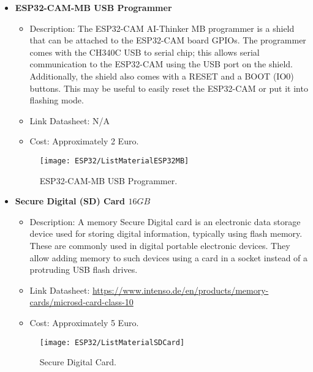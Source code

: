 \begin{itemize}
    \item \textbf{ESP32-CAM-MB USB Programmer} 
    
    \begin{itemize}
        \item Description: The ESP32-CAM AI-Thinker MB programmer is a shield that can be attached to the ESP32-CAM board GPIOs. The programmer comes with the CH340C USB to serial chip; this allows serial communication to the ESP32-CAM using the USB port on the shield. Additionally, the shield also comes with a RESET and a BOOT (IO0) buttons. This may be useful to easily reset the ESP32-CAM or put it into flashing mode.
        \item Link Datasheet: N/A
        \item Cost: Approximately 2 Euro.
    \end{itemize}
    
    \begin{figure}  
        \begin{center}
            \texttt{[image: ESP32/ListMaterialESP32MB]}
            \caption{ESP32-CAM-MB USB Programmer.} 
            \label{fig:ESP32-CAM-MB USB Programmer.}
        \end{center}
    \end{figure}	
    
    \item \textbf{Secure Digital (SD) Card \(16 GB\)} 
    
    \begin{itemize}
        \item Description: A memory Secure Digital card is an electronic data storage device used for storing digital information, typically using flash memory. These are commonly used in digital portable electronic devices. They allow adding memory to such devices using a card in a socket instead of a protruding USB flash drives.
        \item Link Datasheet: \url{https://www.intenso.de/en/products/memory-cards/microsd-card-class-10}
        \item Cost: Approximately 5 Euro.
    \end{itemize}
    \begin{figure}  [H]
        \begin{center}
            \texttt{[image: ESP32/ListMaterialSDCard]}
            \caption{Secure Digital Card.} 
            \label{fig:Secure Digital Card.}
        \end{center}
    \end{figure}	
    

\end{itemize}
